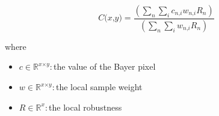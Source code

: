 \documentclass[12pt]{article}
\begin{document}
\[
\textit{C(x,y)} = \frac{(\sum_\textit{n} \sum_\textit{i} \textit{c}_{\textit{n}, \textit{i}}\textit{w}_{\textit{n}, \textit{i}}\textit{R}_{ \textit{n} })}{(\sum_\textit{n} \sum_\textit{i} \textit{w}_{\textit{n}, \textit{i}}\textit{R}_{ \textit{n} })}
\]

where
\begin{itemize}
\item $\textit{c} \in \mathbb{R}^{ \textit{x} \times \textit{y} }:$the value of the Bayer pixel
\item $\textit{w} \in \mathbb{R}^{ \textit{x} \times \textit{y} }:$the local sample weight
\item $\textit{R} \in \mathbb{R}^{ \textit{x}}:$the local robustness
\end{itemize}
\end{document}
